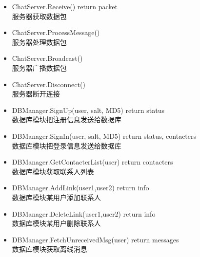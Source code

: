 \begin{itemize}
	\item ChatServer.Receive() return packet \\
	服务器获取数据包
	\item ChatServer.ProcessMessage()\\
	服务器处理数据包
	\item ChatServer.Broadcast()\\
	服务器广播数据包
	\item ChatServer.Disconnect()\\
	服务器断开连接
    \item DBManager.SignUp(user, salt, MD5) return status \\
    数据库模块把注册信息发送给数据库
    \item DBManager.SignIn(user, salt, MD5) return status, contacters\\
    数据库模块把登录信息发送给数据库
    \item DBManager.GetContacterList(user) return contacters\\
    数据库模块获取联系人列表
    \item DBManager.AddLink(user1,user2) return info\\
    数据库模块某用户添加联系人
    \item DBManager.DeleteLink(user1,user2) return info\\
	数据库模块某用户删除联系人
	\item DBManager.FetchUnreceivedMsg(user) return messages\\
	数据库模块获取离线消息
\end{itemize} 